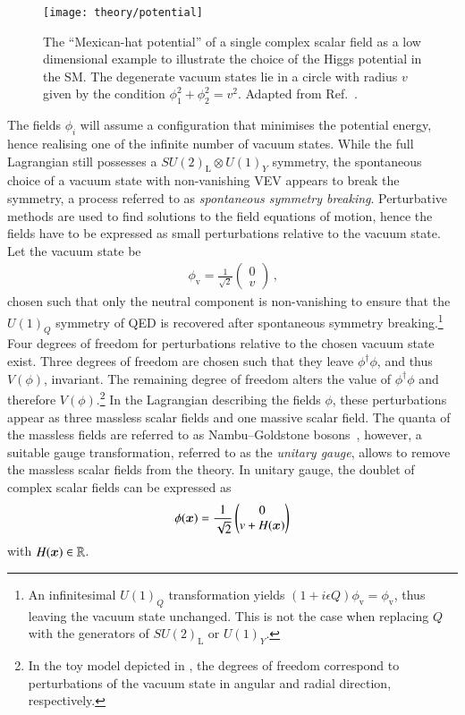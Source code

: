 \begin{figure}[htbp]
  \centering

  \texttt{[image: theory/potential]}

  \caption{The ``Mexican-hat potential'' of a single complex scalar field as a
    low dimensional example to illustrate the choice of the Higgs potential in
    the SM. The degenerate vacuum states lie in a circle with radius $v$ given
    by the condition $\phi_1^2 + \phi_2^2 = v^2$. Adapted from
    Ref.~\cite{higgs_potential_tikz}.}%
  \label{fig:mexican_hat}
\end{figure}

The fields $\phi_i$ will assume a configuration that minimises the potential
energy, hence realising one of the infinite number of vacuum states. While the
full Lagrangian still possesses a $SU(2)_{\text{L}} \otimes U(1)_Y$ symmetry,
the spontaneous choice of a vacuum state with non-vanishing VEV appears to break
the symmetry, a process referred to as \emph{spontaneous symmetry
  breaking}. Perturbative methods are used to find solutions to the field
equations of motion, hence the fields have to be expressed as small
perturbations relative to the vacuum state. Let the vacuum state be
\begin{align*}
  \phi_{\text{v}} = \frac{1}{\sqrt{2}}
  \begin{pmatrix}
    0 \\
    v
  \end{pmatrix} \,\text{,}
\end{align*}
chosen such that only the neutral component is non-vanishing to ensure that the
$U(1)_Q$ symmetry of QED is recovered after spontaneous symmetry
breaking.\footnote{An infinitesimal $U(1)_Q$ transformation yields
  $(1 + i \epsilon Q) \phi_{\text{v}} = \phi_{\text{v}}$, thus leaving the
  vacuum state unchanged. This is not the case when replacing $Q$ with the
  generators of $SU(2)_{\text{L}}$ or $U(1)_Y$.} Four degrees of freedom for
perturbations relative to the chosen vacuum state exist. Three degrees of
freedom are chosen such that they leave $\phi^\dagger \phi$, and thus $V(\phi)$,
invariant. The remaining degree of freedom alters the value of
$\phi^\dagger \phi$ and therefore $V(\phi)$.\footnote{In the toy model depicted
  in , the degrees of freedom correspond to perturbations
  of the vacuum state in angular and radial direction, respectively.} In the
Lagrangian describing the fields $\phi$, these perturbations appear as three
massless scalar fields and one massive scalar field. The quanta of the massless
fields are referred to as Nambu--Goldstone
bosons~\cite{Nambu:1960tm,Goldstone:1961eq}, however, a suitable gauge
transformation, referred to as the \emph{unitary gauge}, allows to remove the
massless scalar fields from the theory. In unitary gauge, the doublet of complex
scalar fields can be expressed as
\begin{align}
  \phi(\bm{x}) = \frac{1}{\sqrt{2}}
  \begin{pmatrix}
    0 \\
    v + H(\bm{x})
  \end{pmatrix}
  \label{eq:vacuum_state_perturb}
\end{align}
with $H(\bm{x}) \in \mathbb{R}$.

